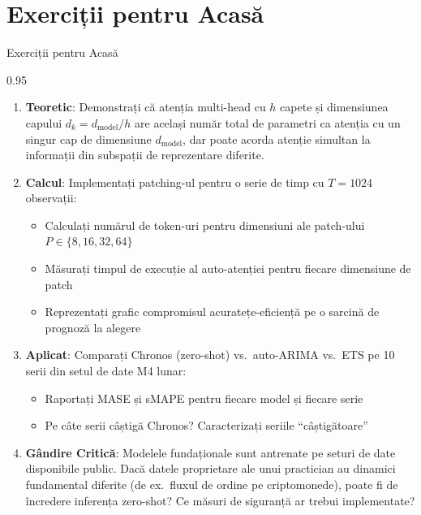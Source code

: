 \documentclass[9pt, aspectratio=169, t]{beamer}
\begin{document}
\section{Exerciții pentru Acasă}

\begin{frame}{Exerciții pentru Acasă}
    \begin{cminipage}{0.95\textwidth}
    {\footnotesize
    \begin{enumerate}\setlength{\itemsep}{2pt}
        \item \textbf{Teoretic}: Demonstrați că atenția multi-head cu $h$ capete și dimensiunea capului $d_k = d_{\text{model}}/h$ are același număr total de parametri ca atenția cu un singur cap de dimensiune $d_{\text{model}}$, dar poate acorda atenție simultan la informații din subspații de reprezentare diferite.

        \item \textbf{Calcul}: Implementați patching-ul pentru o serie de timp cu $T = 1024$ observații:
            \begin{itemize}\setlength{\itemsep}{0pt}
                \item Calculați numărul de token-uri pentru dimensiuni ale patch-ului $P \in \{8, 16, 32, 64\}$
                \item Măsurați timpul de execuție al auto-atenției pentru fiecare dimensiune de patch
                \item Reprezentați grafic compromisul acuratețe-eficiență pe o sarcină de prognoză la alegere
            \end{itemize}

        \item \textbf{Aplicat}: Comparați Chronos (zero-shot) vs.\ auto-ARIMA vs.\ ETS pe 10 serii din setul de date M4 lunar:
            \begin{itemize}\setlength{\itemsep}{0pt}
                \item Raportați MASE și sMAPE pentru fiecare model și fiecare serie
                \item Pe câte serii câștigă Chronos? Caracterizați seriile ``câștigătoare''
            \end{itemize}

        \item \textbf{Gândire Critică}: Modelele fundaționale sunt antrenate pe seturi de date disponibile public. Dacă datele proprietare ale unui practician au dinamici fundamental diferite (de ex.\ fluxul de ordine pe criptomonede), poate fi de încredere inferența zero-shot? Ce măsuri de siguranță ar trebui implementate?
    \end{enumerate}
    }
    \end{cminipage}
\end{frame}
\end{document}
